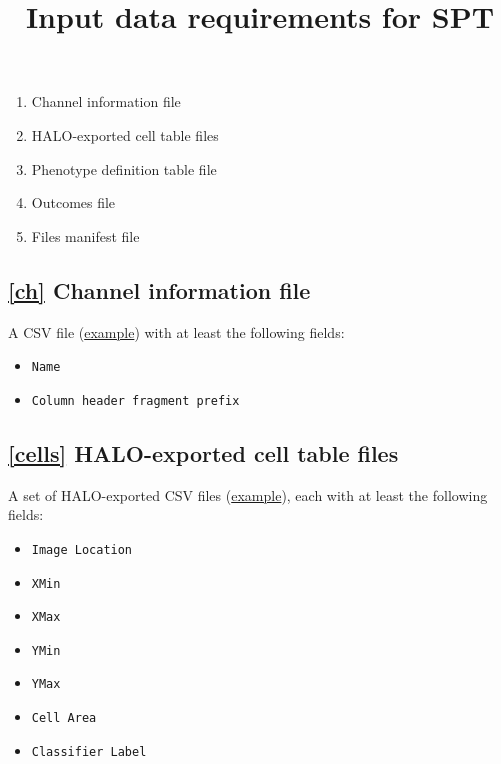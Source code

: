 \documentclass[14pt]{article}
\begin{document}
\title{Input data requirements for SPT }
\author{}
\maketitle

\begin{center}
\begin{varwidth}{0.4\textwidth}
\begin{enumerate}
  \itemsep0em
  \item{\label{ch}Channel information file}
  \item{\label{cells}HALO-exported cell table files}
  \item{\label{phenotype}Phenotype definition table file}
  \item{\label{outcomes}Outcomes file}
  \item{\label{files}Files manifest file}
\end{enumerate}
\end{varwidth}
\end{center}

\newpage

\subsection*{\ref{ch} Channel information file}
A CSV file (\href{https://github.com/nadeemlab/SPT/blob/main/tests/data/elementary_phenotypes.csv}{example})
 with at least the following fields:

\begin{itemize}
  \itemsep0em
  \item[]{\colorbox{yellow!25}{\texttt{Name}}}
  \item[]{\colorbox{yellow!25}{\texttt{Column header fragment prefix}}}
\end{itemize}

\subsection*{\ref{cells} HALO-exported cell table files} A set of HALO-exported CSV files (\href{https://github.com/nadeemlab/SPT/blob/main/tests/data/2779f21192cb0ce1479b2bf7fb20ebba.csv}{example}), each with at least the following fields:

\begin{itemize}
  \itemsep0em
  \item[]{\colorbox{yellow!25}{\texttt{Image Location}}}
  \item[]{\colorbox{yellow!25}{\texttt{XMin}}}
  \item[]{\colorbox{yellow!25}{\texttt{XMax}}}
  \item[]{\colorbox{yellow!25}{\texttt{YMin}}}
  \item[]{\colorbox{yellow!25}{\texttt{YMax}}}
  \item[]{\colorbox{yellow!25}{\texttt{Cell Area}}}
  \item[]{\colorbox{yellow!25}{\texttt{Classifier Label}}}
\end{itemize}
\end{document}
